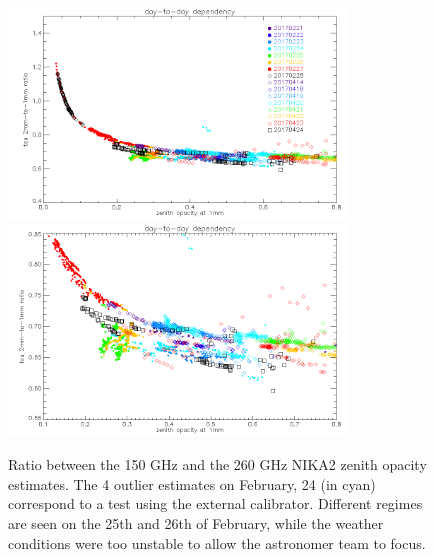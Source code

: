 \begin{figure}[ht]
\begin{center}
  \includegraphics[width=0.8\textwidth]{Figures/opacity_tau1_tau2_ratio_perday_N2R9_N2R10.png}
  \includegraphics[width=0.8\textwidth]{Figures/opacity_tau1_tau2_ratio_perday_zoom_N2R9_N2R10.png}
  \caption{Ratio between the 150 GHz and the 260 GHz NIKA2 zenith
    opacity estimates. The 4 outlier estimates on February, 24 (in
    cyan) correspond to a test using the external
    calibrator. Different regimes are seen on the 25th and 26th of
    February, while the weather conditions were too unstable to allow
    the astronomer team to focus.
  }
  \label{fig:opacity_ratio_perday}
\end{center}
\end{figure}


